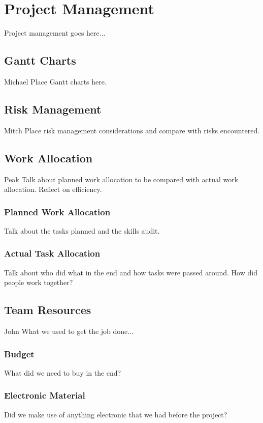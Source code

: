 \chapter{Project Management}
Project management goes here...

\section{Gantt Charts}
Michael
Place Gantt charts here.

\section{Risk Management}
Mitch
Place risk management considerations and compare with risks encountered.

\section{Work Allocation}
Peak
Talk about planned work allocation to be compared with actual work allocation. Reflect on efficiency.

\subsection{Planned Work Allocation}
Talk about the tasks planned and the skills audit.

\subsection{Actual Task Allocation}
Talk about who did what in the end and how tasks were passed around. How did people work together?

\section{Team Resources}
John
What we used to get the job done...

\subsection{Budget}
What did we need to buy in the end?

\subsection{Electronic Material}
Did we make use of anything electronic that we had before the project?

